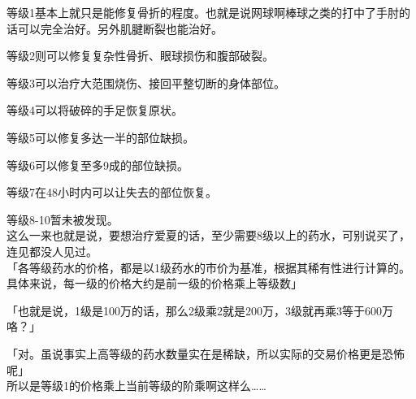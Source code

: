 等级1基本上就只是能修复骨折的程度。也就是说网球啊棒球之类的打中了手肘的话可以完全治好。另外肌腱断裂也能治好。

等级2则可以修复复杂性骨折、眼球损伤和腹部破裂。

等级3可以治疗大范围烧伤、接回平整切断的身体部位。

等级4可以将破碎的手足恢复原状。

等级5可以修复多达一半的部位缺损。

等级6可以修复至多9成的部位缺损。

等级7在48小时内可以让失去的部位恢复。

等级8-10暂未被发现。\\

这么一来也就是说，要想治疗爱夏的话，至少需要8级以上的药水，可别说买了，连见都没人见过。\\

「各等级药水的价格，都是以1级药水的市价为基准，根据其稀有性进行计算的。具体来说，每一级的价格大约是前一级的价格乘上等级数」

「也就是说，1级是100万的话，那么2级乘2就是200万，3级就再乘3等于600万咯？」

「对。虽说事实上高等级的药水数量实在是稀缺，所以实际的交易价格更是恐怖呢」\\

所以是等级1的价格乘上当前等级的阶乘啊这样么……\\

